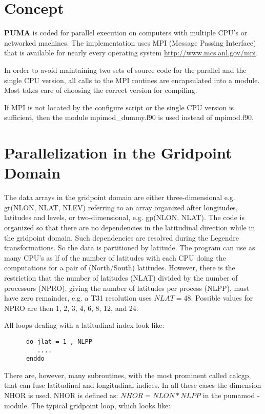 \section{Concept}

{\bf PUMA} is coded for parallel execution
on computers with multiple CPU's or networked machines.
The implementation uses MPI (Message Passing Interface)
that is available for nearly every operating system
{\url{http://www.mcs.anl.gov/mpi}}.

In order to avoid maintaining two sets of source code
for the parallel and the single CPU version, all
calls to the MPI routines are encapsulated into a module.
Most takes care of choosing the correct version for compiling.

If MPI is not located by the configure script or the single CPU
version is sufficient, then the module {\module mpimod\_dummy.f90}
is used instead of {\module mpimod.f90}.



\section{Parallelization in the Gridpoint Domain}

The data arrays in the gridpoint domain are either 
three-dimensional e.g. gt(NLON, NLAT, NLEV) referring
to an array organized after longitudes, latitudes and levels,
or two-dimensional, e.g. gp(NLON, NLAT).
The code is organized so that there are no dependencies
in the latitudinal direction while in the gridpoint domain.
Such dependencies are resolved during the Legendre transformations.
So the data is partitioned by latitude.
The program can use as many CPU's as lf of the number of latitudes
with each CPU doing 
the computations for a pair of (North/South) latitudes.
However, there is the restriction that the number of latitudes
(NLAT) divided by the number of processors (NPRO), giving
the number of latitudes per process (NLPP), must have zero
remainder, e.g. a T31 resolution uses $NLAT=48$.
Possible values for NPRO are then 1, 2, 3, 4, 6, 8, 12, and 24.


All loops dealing with a latitudinal index look like:
\begin{verbatim}
      do jlat = 1 , NLPP
         ....
      enddo
\end{verbatim}

There are, however, many subroutines, with the most prominent
called {\sub calcgp}, that can fuse latitudinal and longitudinal
indices. In all these cases the dimension NHOR is used.
NHOR is defined as: $NHOR = NLON * NLPP$ in the 
{\module pumamod} - module. The typical gridpoint loop, which looks like:

